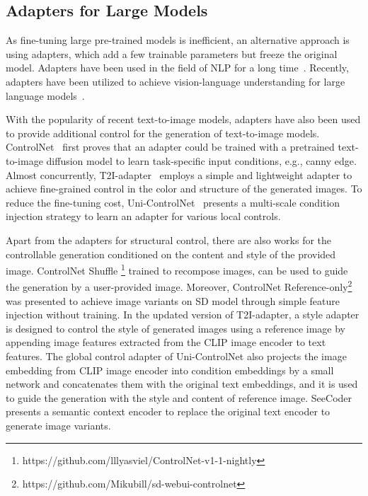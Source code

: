\documentclass{article}
\begin{document}
\subsection{Adapters for Large Models}

As fine-tuning large pre-trained models is inefficient, an alternative approach is using adapters, which add a few trainable parameters but freeze the original model. Adapters have been used in the field of NLP for a long time~\cite{houlsby2019parameter}. Recently, adapters have been utilized to achieve vision-language understanding for large language models~\cite{li2023blip,zhu2023minigpt,zhang2023llama,gao2023llama,zeng2023matters}.

With the popularity of recent text-to-image models, adapters have also been used to provide additional control for the generation of text-to-image models. ControlNet~\cite{zhang2023adding} first proves that an adapter could be trained with a pretrained text-to-image diffusion model to learn task-specific input conditions, e.g., canny edge. Almost concurrently, T2I-adapter~\cite{mou2023t2i} employs a simple and lightweight adapter to achieve
fine-grained control in the color and structure of the generated images. To reduce the fine-tuning cost, Uni-ControlNet~\cite{zhao2023uni} presents a multi-scale condition injection strategy to learn an adapter for various local controls.

Apart from the adapters for structural control, there are also works for the controllable generation conditioned on the content and style of the provided image. ControlNet Shuffle \footnote{https://github.com/lllyasviel/ControlNet-v1-1-nightly} trained to recompose images, can be used to guide the generation by a user-provided image. Moreover, ControlNet Reference-only\footnote{https://github.com/Mikubill/sd-webui-controlnet} was presented to achieve image variants on SD model through simple feature injection without training. In the updated version of T2I-adapter, a style adapter is designed to control the style of generated images using a reference image by appending image features extracted from the CLIP image encoder to text features. The global control adapter of Uni-ControlNet also projects the image embedding from CLIP image encoder into condition embeddings by a small network and concatenates them with the original text embeddings, and it is used to guide the generation with the style and content of reference image. SeeCoder~\cite{xu2023prompt} presents a semantic context encoder to replace the original text encoder to generate image variants.
\end{document}
